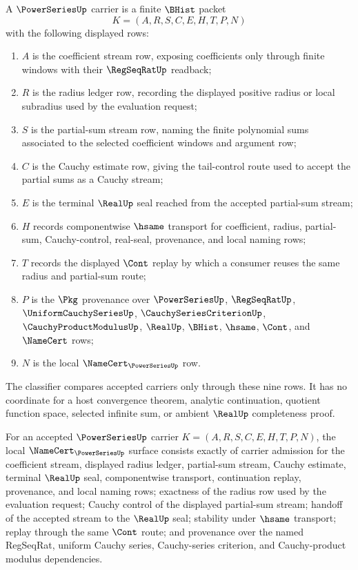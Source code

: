 \begin{definition}
\label{def:power-series-namecert-carrier}
A $\PowerSeriesUp$ carrier is a finite $\BHist$ packet
$$
K=(A,R,S,C,E,H,T,P,N)
$$
with the following displayed rows:
\begin{enumerate}
\item $A$ is the coefficient stream row, exposing coefficients only through finite windows with their $\RegSeqRatUp$ readback;
\item $R$ is the radius ledger row, recording the displayed positive radius or local subradius used by the evaluation request;
\item $S$ is the partial-sum stream row, naming the finite polynomial sums associated to the selected coefficient windows and argument row;
\item $C$ is the Cauchy estimate row, giving the tail-control route used to accept the partial sums as a Cauchy stream;
\item $E$ is the terminal $\RealUp$ seal reached from the accepted partial-sum stream;
\item $H$ records componentwise $\hsame$ transport for coefficient, radius, partial-sum, Cauchy-control, real-seal, provenance, and local naming rows;
\item $T$ records the displayed $\Cont$ replay by which a consumer reuses the same radius and partial-sum route;
\item $P$ is the $\Pkg$ provenance over $\PowerSeriesUp$, $\RegSeqRatUp$, $\UniformCauchySeriesUp$, $\CauchySeriesCriterionUp$, $\CauchyProductModulusUp$, $\RealUp$, $\BHist$, $\hsame$, $\Cont$, and $\NameCert$ rows;
\item $N$ is the local $\NameCert_{\PowerSeriesUp}$ row.
\end{enumerate}
The classifier compares accepted carriers only through these nine rows. It has no coordinate for a host convergence theorem, analytic continuation, quotient function space, selected infinite sum, or ambient $\RealUp$ completeness proof.
\end{definition}

\begin{theorem}
\label{thm:power-series-namecert-obligations}
For an accepted $\PowerSeriesUp$ carrier $K=(A,R,S,C,E,H,T,P,N)$, the local $\NameCert_{\PowerSeriesUp}$ surface consists exactly of carrier admission for the coefficient stream, displayed radius ledger, partial-sum stream, Cauchy estimate, terminal $\RealUp$ seal, componentwise transport, continuation replay, provenance, and local naming rows; exactness of the radius row used by the evaluation request; Cauchy control of the displayed partial-sum stream; handoff of the accepted stream to the $\RealUp$ seal; stability under $\hsame$ transport; replay through the same $\Cont$ route; and provenance over the named RegSeqRat, uniform Cauchy series, Cauchy-series criterion, and Cauchy-product modulus dependencies.
\end{theorem}

